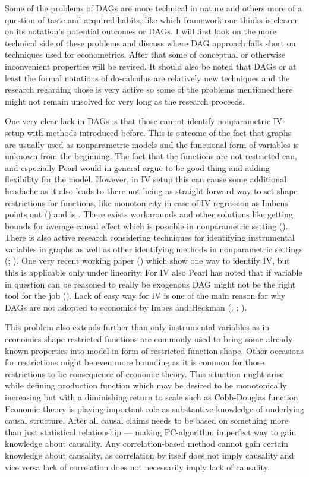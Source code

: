 \documentclass[main=english,12pt,a4paper,pdftex,econ,utf8]{aaltothesis}
\begin{document}
Some of the problems of DAGs are more technical in nature and others more of a question of taste and acquired habits, like which framework one thinks is clearer on its notation's potential outcomes or DAGs. I will first look on the more technical side of these problems and discuss where DAG approach falls short on techniques used for econometrics. After that some of conceptual or otherwise inconvenient properties will be revised. It should also be noted that DAGs or at least the formal notations of do-calculus are relatively new techniques and the research regarding those is very active so some of the problems mentioned here might not remain unsolved for very long as the research proceeds.

One very clear lack in DAGs is that those cannot identify nonparametric IV-setup with methods introduced before. This is outcome of the fact that graphs are usually used as nonparametric models and the functional form of variables is unknown from the beginning. The fact that the functions are not restricted can, and especially Pearl would in general argue to be good thing and adding flexibility for the model. However, in IV setup this can cause some additional headache as it also leads to there not being as straight forward way to set shape restrictions for functions, like monotonicity in case of IV-regression as Imbens points out (\cite{imbes2020}) and is . There exists workarounds and other solutions like getting bounds for average causal effect which is possible in nonparametric setting (\cite{Balke1997}). There is also active research considering techniques for identifying instrumental variables in graphs as well as other identifying methods in nonparametric settings (\cite{Freyberger2017}; \cite{Freyberger2015}). One very recent working paper (\cite{Hoveid2021}) which show one way to identify IV, but this is applicable only under linearity. For IV also Pearl has noted that if variable in question can be reasoned to really be exogenous DAG might not be the right tool for the job (\cite{PearlMackenzie18}). Lack of easy way for IV is one of the main reason for why DAGs are not adopted to economics by Imbes and Heckman (\cite{Imbens2014}; \cite{imbes2020}; \cite{Heckman2015}).

This problem also extends further than only instrumental variables as in economics shape restricted functions are commonly used to bring some already known properties into model in form of restricted function shape. Other occasions for restrictions might be even more bounding as it is common for those restrictions to be consequence of economic theory. This situation might arise while defining production function which may be desired to be monotonically increasing but with a diminishing return to scale such as Cobb-Douglas function. Economic theory is playing important role as substantive knowledge of underlying causal structure. After all causal claims needs to be based on something more than just statistical relationship --- making PC-algorithm imperfect way to gain knowledge about causality. Any correlation-based method cannot gain certain knowledge about causality, as correlation by itself does not imply causality and vice versa lack of correlation does not necessarily imply lack of causality.
\end{document}
